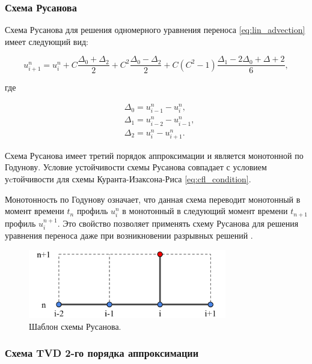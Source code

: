 \subsubsection{Схема Русанова}

Схема Русанова \cite{kholodov} для решения одномерного уравнения переноса \eqref{eq:lin_advection} имеет следующий вид:

\begin{equation}
    u_{i+1}^n = u_i^n + C\frac{\Delta_0 + \Delta_2}{2} + C^2 \dfrac{\Delta_0 - \Delta_2}{2} + C\left(C^2 - 1\right) \dfrac{\Delta_1 - 2\Delta_0 + \Delta+2}{6},
    \label{eq:rusanov}
\end{equation}

\noindent где

\begin{align*}
    & \Delta_0 = u_{i-1}^n - u_i^n, \\
    & \Delta_1 = u_{i-2}^n - u_{i-1}^n, \\
    & \Delta_2 = u_{i}^n - u_{i+1}^n .
\end{align*}

\noindent Схема Русанова имеет третий порядок аппроксимации и является монотонной по Годунову. Условие устойчивости схемы Русанова совпадает с условием уcтойчивости для схемы Куранта-Изаксона-Риса \eqref{eq:cfl_condition}.

Монотонность по Годунову означает, что данная схема переводит монотонный в момент времени $t_n$ профиль $u_i^n$ в монотонный в следующий момент времени $t_{n+1}$ профиль $u_i^{n+1}$. Это свойство позволяет применять схему Русанова для решения уравнения переноса даже при возникновении разрывных решений \cite{kholodov}.

\begin{figure}[!htb]
    \centering
    \includegraphics[height=3cm]{images/theory/scheme_rusanov.png}
    \caption{Шаблон схемы Русанова.}
    \label{fig:scheme_rusanov}
\end{figure}

\subsubsection{Схема TVD 2-го порядка аппроксимации}

